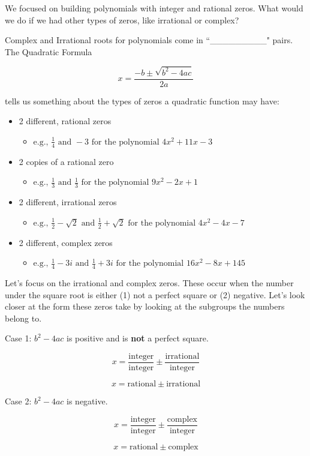 \documentclass{ximera}
\begin{document}
We focused on building polynomials with integer and rational zeros. What would we do if we had other types of zeros, like irrational or complex?

\begin{theorem}
Complex and Irrational roots for polynomials come in ``\_\_\_\_\_\_\_\_\_" pairs. \\

The Quadratic Formula

$$x = \frac{-b \pm \sqrt{b^2 - 4ac}}{2a}$$

tells us something about the types of zeros a quadratic function may have:
	\begin{itemize}
		\item 2 different, rational zeros
			\begin{itemize}
				\item $\text{e.g., } \frac{1}{4} \text{ and } -3 \text{ for the polynomial } 4x^2+11x-3$
			\end{itemize}
		\item 2 copies of a rational zero
			\begin{itemize}
				\item $\text{e.g., } \frac{1}{3} \text{ and } \frac{1}{3} \text{ for the polynomial } 9x^2-2x+1$
			\end{itemize}
		\item 2 different, irrational zeros
			\begin{itemize}
				\item $\text{e.g., } \frac{1}{2} - \sqrt{2} \text{ and } \frac{1}{2} + \sqrt{2} \text{ for the polynomial } 4x^2-4x-7$
			\end{itemize}
		\item 2 different, complex zeros
			\begin{itemize}
				\item $\text{e.g., } \frac{1}{4}-3i \text{ and } \frac{1}{4}+3i \text{ for the polynomial } 16x^2-8x+145$
			\end{itemize}
	\end{itemize}

Let's focus on the irrational and complex zeros. These occur when the number under the square root is either (1) not a perfect square or (2) negative. Let's look closer at the form these zeros take by looking at the subgroups the numbers belong to.

Case 1: $b^2 - 4ac$ is positive and is \textbf{not} a perfect square.

$$x = \frac{\text{integer}}{\text{integer}} \pm \frac{\text{irrational}}{\text{integer}}$$

$$ x = \text{rational} \pm \text{irrational} $$

Case 2: $b^2 - 4ac$ is negative.

$$x = \frac{\text{integer}}{\text{integer}} \pm \frac{\text{complex}}{\text{integer}}$$

$$ x = \text{rational} \pm \text{complex} $$
\end{theorem}
\end{document}
